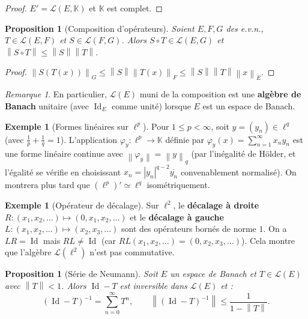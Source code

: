 \documentclass[a4paper,12pt]{book}
\DeclareMathOperator{\Id}{Id}
\newcommand{\K}{\mathbb{K}}
\newcommand{\norm}[1]{\left\| #1 \right\|}
\newcommand{\abs}[1]{\left| #1 \right|}
\theoremstyle{definition}
\newtheorem{exemple}[definition]{Exemple}
\theoremstyle{plain}
\newtheorem{proposition}[definition]{Proposition}
\theoremstyle{remark}
\newtheorem{remarque}[definition]{Remarque}
\begin{document}
\begin{proof}
$E' = \mathcal{L}(E, \K)$ et $\K$ est complet.
\end{proof}

\begin{proposition}[Composition d'opérateurs]\label{prop:composition-op}
Soient $E, F, G$ des e.v.n., $T \in \mathcal{L}(E,F)$ et $S \in \mathcal{L}(F,G)$. Alors $S \circ T \in \mathcal{L}(E,G)$ et $\norm{S \circ T} \leq \norm{S}\norm{T}$.
\end{proposition}

\begin{proof}
$\norm{S(T(x))}_G \leq \norm{S}\norm{T(x)}_F \leq \norm{S}\norm{T}\norm{x}_E$.
\end{proof}

\begin{remarque}\label{rem:algebre-banach}
En particulier, $\mathcal{L}(E)$ muni de la composition est une \textbf{algèbre de Banach} unitaire (avec $\Id_E$ comme unité) lorsque $E$ est un espace de Banach.
\end{remarque}

\begin{exemple}[Formes linéaires sur $\ell^p$]\label{ex:formes-lin-ell-p}
Pour $1 \leq p < \infty$, soit $y = (y_n) \in \ell^q$ (avec $\frac{1}{p} + \frac{1}{q} = 1$). L'application $\varphi_y : \ell^p \to \K$ définie par $\varphi_y(x) = \sum_{n=1}^\infty x_n y_n$ est une forme linéaire continue avec $\norm{\varphi_y} = \norm{y}_q$ (par l'inégalité de Hölder, et l'égalité se vérifie en choisissant $x_n = \abs{y_n}^{q-2}\overline{y_n}$ convenablement normalisé). On montrera plus tard que $(\ell^p)' \simeq \ell^q$ isométriquement.
\end{exemple}

\begin{exemple}[Opérateur de décalage]\label{ex:decalage}
Sur $\ell^2$, le \textbf{décalage à droite} $R : (x_1, x_2, \ldots) \mapsto (0, x_1, x_2, \ldots)$ et le \textbf{décalage à gauche} $L : (x_1, x_2, \ldots) \mapsto (x_2, x_3, \ldots)$ sont des opérateurs bornés de norme $1$. On a $LR = \Id$ mais $RL \neq \Id$ (car $RL(x_1, x_2, \ldots) = (0, x_2, x_3, \ldots)$). Cela montre que l'algèbre $\mathcal{L}(\ell^2)$ n'est pas commutative.
\end{exemple}

\begin{proposition}[Série de Neumann]\label{prop:neumann}
Soit $E$ un espace de Banach et $T \in \mathcal{L}(E)$ avec $\norm{T} < 1$. Alors $\Id - T$ est inversible dans $\mathcal{L}(E)$ et :
\[
    (\Id - T)^{-1} = \sum_{n=0}^{\infty} T^n, \qquad \norm{(\Id - T)^{-1}} \leq \frac{1}{1 - \norm{T}}.
\]
\end{proposition}
\end{document}
